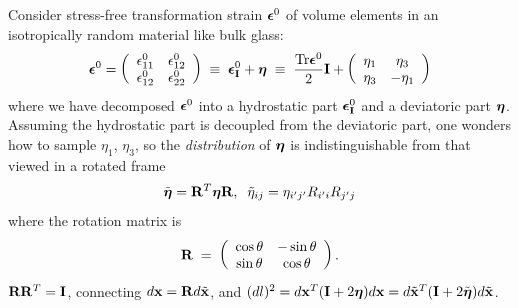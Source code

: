 \documentclass[12pt]{article}
\def\bmath#1{\mbox{\boldmath$#1$}}
\begin{document}
Consider stress-free transformation strain $\bmath{\epsilon}^0$ of
volume elements in an isotropically random material like bulk glass:
\begin{equation}
\bmath{\epsilon}^0 = 
 \left(\begin{array}{cc}
\epsilon^0_{11} & \epsilon^0_{12}\\
\epsilon^0_{12} & \epsilon^0_{22}
\end{array}\right) \;\equiv\; 
\bmath{\epsilon}^0_{\bf I} + \bmath{\eta}
\;\equiv\; 
\frac{{\rm Tr}\bmath{\epsilon}^0}{2}{\bf I} + 
\left(\begin{array}{cc}
\eta_1 & \eta_3\\
\eta_3 & -\eta_1
\end{array}\right)
\end{equation}
where we have decomposed $\bmath{\epsilon}^0$ into a hydrostatic part
$\bmath{\epsilon}^0_{\bf I}$ and a deviatoric part
$\bmath{\eta}$. Assuming the hydrostatic part is decoupled from the
deviatoric part, one wonders how to sample $\eta_1$, $\eta_3$, so the
{\em distribution} of $\bmath{\eta}$ is indistinguishable from that
viewed in a rotated frame 
\begin{equation}
 \tilde{\bmath{\eta}}={\bf R}^T\bmath{\eta}{\bf R},  \;\; 
 \tilde{\eta}_{ij} = \eta_{i'j'}R_{i'i}R_{j'j}
\end{equation}
where the
rotation matrix is
\begin{equation}
 {\bf R} \;=\; \left(\begin{array}{cc}
\cos\theta & -\sin\theta\\
\sin\theta &  \cos\theta
\end{array}\right).
\end{equation}
${\bf R}{\bf R}^T={\bf I}$, connecting $d{\bf x}={\bf R}d\tilde{\bf
x}$, and $(dl)^2 = d{\bf x}^T({\bf I}+2\bmath{\eta})d{\bf x} =
d\tilde{\bf x}^T({\bf I}+2\tilde{\bmath{\eta}})d\tilde{\bf x}$.
\end{document}
